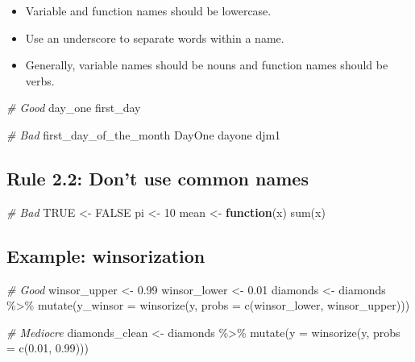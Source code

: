 \documentclass[
  letterpaper,
  DIV=11,
  numbers=noendperiod]{scrreprt}
\newenvironment{Shaded}{\begin{snugshade}}{\end{snugshade}}
\newcommand{\AttributeTok}[1]{\textcolor[rgb]{0.49,0.56,0.16}{#1}}
\newcommand{\CommentTok}[1]{\textcolor[rgb]{0.38,0.63,0.69}{\textit{#1}}}
\newcommand{\ConstantTok}[1]{\textcolor[rgb]{0.53,0.00,0.00}{#1}}
\newcommand{\ControlFlowTok}[1]{\textcolor[rgb]{0.00,0.44,0.13}{\textbf{#1}}}
\newcommand{\DecValTok}[1]{\textcolor[rgb]{0.25,0.63,0.44}{#1}}
\newcommand{\FloatTok}[1]{\textcolor[rgb]{0.25,0.63,0.44}{#1}}
\newcommand{\FunctionTok}[1]{\textcolor[rgb]{0.02,0.16,0.49}{#1}}
\newcommand{\NormalTok}[1]{\textcolor[rgb]{0.00,0.44,0.13}{#1}}
\newcommand{\OtherTok}[1]{\textcolor[rgb]{0.00,0.44,0.13}{#1}}
\newcommand{\SpecialCharTok}[1]{\textcolor[rgb]{0.25,0.44,0.63}{#1}}
\providecommand{\tightlist}{%
  \setlength{\itemsep}{0pt}\setlength{\parskip}{0pt}}\usepackage{longtable,booktabs,array}
\begin{document}
\begin{itemize}
\tightlist
\item
  Variable and function names should be lowercase.
\item
  Use an underscore to separate words within a name.
\item
  Generally, variable names should be nouns and function names should be
  verbs.
\end{itemize}

\begin{Shaded}
\begin{Highlighting}[]
\CommentTok{\# Good}
\NormalTok{day\_one}
\NormalTok{first\_day}

\CommentTok{\# Bad}
\NormalTok{first\_day\_of\_the\_month}
\NormalTok{DayOne}
\NormalTok{dayone}
\NormalTok{djm1}
\end{Highlighting}
\end{Shaded}

\hypertarget{rule-2.2-dont-use-common-names}{%
\subsection{Rule 2.2: Don't use common
names}\label{rule-2.2-dont-use-common-names}}

\begin{Shaded}
\begin{Highlighting}[]
\CommentTok{\# Bad}
\ConstantTok{TRUE} \OtherTok{\textless{}{-}} \ConstantTok{FALSE}
\NormalTok{pi }\OtherTok{\textless{}{-}} \DecValTok{10}
\NormalTok{mean }\OtherTok{\textless{}{-}} \ControlFlowTok{function}\NormalTok{(x) }\FunctionTok{sum}\NormalTok{(x)}
\end{Highlighting}
\end{Shaded}

\hypertarget{example-winsorization}{%
\subsection{Example: winsorization}\label{example-winsorization}}

\begin{Shaded}
\begin{Highlighting}[]
\CommentTok{\# Good}
\NormalTok{winsor\_upper }\OtherTok{\textless{}{-}} \FloatTok{0.99}
\NormalTok{winsor\_lower }\OtherTok{\textless{}{-}} \FloatTok{0.01}
\NormalTok{diamonds }\OtherTok{\textless{}{-}}
\NormalTok{  diamonds }\SpecialCharTok{\%\textgreater{}\%}
  \FunctionTok{mutate}\NormalTok{(}\AttributeTok{y\_winsor =} \FunctionTok{winsorize}\NormalTok{(y, }\AttributeTok{probs =} \FunctionTok{c}\NormalTok{(winsor\_lower, winsor\_upper)))}

\CommentTok{\# Mediocre}
\NormalTok{diamonds\_clean }\OtherTok{\textless{}{-}}
\NormalTok{  diamonds }\SpecialCharTok{\%\textgreater{}\%}
  \FunctionTok{mutate}\NormalTok{(}\AttributeTok{y =} \FunctionTok{winsorize}\NormalTok{(y, }\AttributeTok{probs =} \FunctionTok{c}\NormalTok{(}\FloatTok{0.01}\NormalTok{, }\FloatTok{0.99}\NormalTok{)))}
\end{Highlighting}
\end{Shaded}
\end{document}
